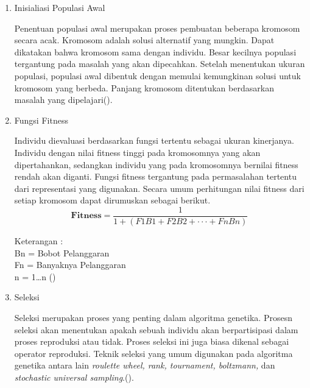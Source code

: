 \begin{enumerate}
  \item Inisialiasi Populasi Awal
  
  Penentuan populasi awal merupakan proses pembuatan beberapa kromosom secara acak. Kromosom adalah solusi alternatif yang mungkin. Dapat dikatakan bahwa kromosom sama dengan individu. Besar kecilnya populasi tergantung pada masalah yang akan dipecahkan. Setelah menentukan ukuran populasi, populasi awal dibentuk dengan memulai kemungkinan solusi untuk kromosom yang berbeda. Panjang kromosom ditentukan berdasarkan masalah yang dipelajari(\cite{Ardiansyah2022}).
  \item Fungsi Fitness
  
  Individu dievaluasi berdasarkan fungsi tertentu sebagai ukuran kinerjanya. 
  Individu dengan nilai fitness tinggi pada kromosomnya yang akan dipertahankan, 
  sedangkan individu yang pada kromosomnya bernilai fitness rendah akan diganti. 
  Fungsi fitness tergantung pada permasalahan tertentu dari representasi yang digunakan. 
  Secara umum perhitungan nilai fitness dari setiap kromosom dapat dirumuskan sebagai berikut.
  \begin{equation}
    \label{eq:fitness}
    \mathbf{Fitness} = \frac{1}{1 + (F1B1 + F2B2 + \cdot \cdot \cdot +  FnBn)}\; 
  \end{equation}

  Keterangan :\\
  Bn = Bobot Pelanggaran\\
  Fn = Banyaknya Pelanggaran\\
  n  = 1…n (\cite{muhammad2020penjadwalan})
  \item Seleksi
  
  Seleksi merupakan proses yang penting dalam algoritma genetika. 
  Prosesn seleksi akan menentukan apakah sebuah individu akan berpartisipasi dalam proses reproduksi atau tidak.
  Proses seleksi ini juga biasa dikenal sebagai operator reproduksi. 
  Teknik seleksi yang umum digunakan pada algoritma genetika antara lain \emph{roulette wheel, rank, tournament, boltzmann,} dan \emph{stochastic universal sampling}.(\cite{Katoch2020}).
  

\end{enumerate}
